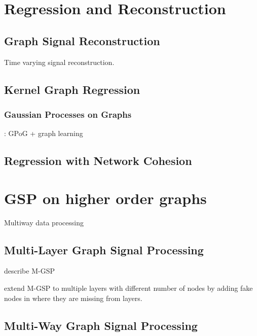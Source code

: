 \section{Regression and Reconstruction}


\subsection{Graph Signal Reconstruction}

\cite{Qiu2017} Time varying signal reconstruction. 

\subsection{Kernel Graph Regression}

\cite{Elias2022}

\cite{Venkitaraman2019}


\subsubsection{Gaussian Processes on Graphs}

\cite{Venkitaraman2020}

\cite{Miao2022}: GPoG + graph learning

\subsection{Regression with Network Cohesion}

\cite{Le2022}

\cite{Li2019}

\section{GSP on higher order graphs}

Multiway data processing 

\cite{Smilde2004}
\cite{Kroonenberg2008}


\cite{Ji2019}

\cite{Cammoun2009}


\subsection{Multi-Layer Graph Signal Processing}

\cite{Zhang2022} describe M-GSP 

\cite{Zhang2018} extend M-GSP to multiple layers with different number of nodes by adding fake nodes in where they are missing from layers. 
 

\subsection{Multi-Way Graph Signal Processing}


